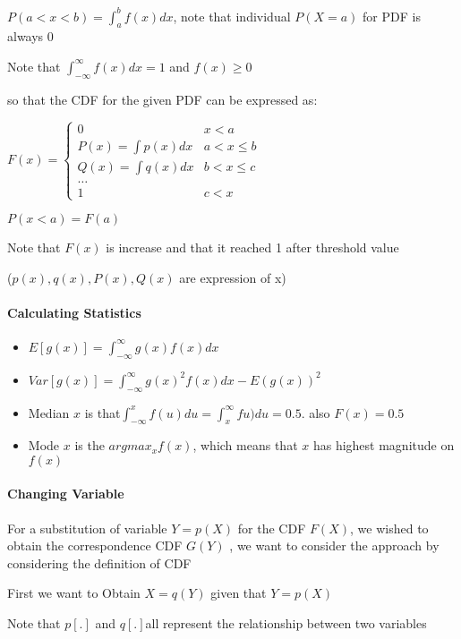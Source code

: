 \documentclass[]{article}
\let\oldparagraph\paragraph
\renewcommand{\paragraph}[1]{\oldparagraph{#1}\mbox{}}
\begin{document}
\(P(a<x<b) = \int^b_a f(x) dx\), note that individual \(P(X = a)\) for
PDF is always 0

Note that \(\int^{\infty}_{-\infty} f(x) dx  = 1\) and \(f(x) \ge 0\)

so that the CDF for the given PDF can be expressed as:

\(F(x) = \begin{cases}0&x<a\\P(x) = \int{p(x)} dx& a<x\le b\\Q(x) = \int {q(x)} dx & b<x\le c\\ \dots \\ 1& c<x\end{cases}\)

\(P(x<a) = F(a)\)

Note that \(F(x)\) is increase and that it reached 1 after threshold
value

(\(p(x),q(x),P(x),Q(x)\) are expression of x)

\paragraph{Calculating Statistics}\label{header-n25}

\begin{itemize}
\item
  \(E[g(x)] = \int^{\infty}_{-\infty} g(x)f(x)dx\)
\item
  \(Var[g(x)] = \int^{\infty}_{-\infty}g(x)^2f(x) dx - {E(g(x))}^2\)
\item
  Median \(x\) is
  that\(\int^x_{-\infty} f(u) du =\int^{\infty}_{x}fu) du =0.5\). also
  \(F(x) = 0.5\)
\item
  Mode \(x\) is the \(argmax_x f(x)\), which means that \(x\) has
  highest magnitude on \(f(x)\)
\end{itemize}

\paragraph{Changing Variable}\label{header-n35}

For a substitution of variable \(Y = p(X)\) for the CDF \(F(X)\), we
wished to obtain the correspondence CDF \(G(Y)\) , we want to consider
the approach by considering the definition of CDF

First we want to Obtain \(X = q(Y)\) given that \(Y = p(X)\)

Note that \(p[.]\) and \(q[.] \)all represent the relationship between
two variables
\end{document}

